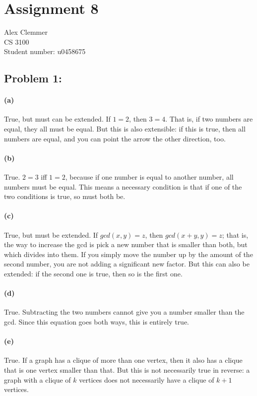 \documentclass[a4paper]{article}
\begin{document}
\section*{Assignment 8}
Alex Clemmer\\
CS 3100 \\
Student number: u0458675

\subsection*{Problem 1:} 

\paragraph{(a)} True, but must can be extended. If $1=2$, then $3=4$. That is, if two numbers are equal, they all must be equal. But this is also extensible: if this is true, then all numbers are equal, and you can point the arrow the other direction, too.

\paragraph{(b)} True. $2=3$ iff $1=2$, because if one number is equal to another number, all numbers must be equal. This means a necessary condition is that if one of the two conditions is true, so must both be.

\paragraph{(c)} True, but must be extended. If $gcd(x,y) = z$, then $gcd(x+y,y)=z$; that is, the way to increase the gcd is pick a new number that is smaller than both, but which divides into them. If you simply move the number up by the amount of the second number, you are not adding a significant new factor. But this can also be extended: if the second one is true, then so is the first one.

\paragraph{(d)} True. Subtracting the two numbers cannot give you a number smaller than the gcd. Since this equation goes both ways, this is entirely true.

\paragraph{(e)} True. If a graph has a clique of more than one vertex, then it also has a clique that is one vertex smaller than that. But this is not necessarily true in reverse: a graph with a clique of $k$ vertices does not necessarily have a clique of $k+1$ vertices.
\end{document}
